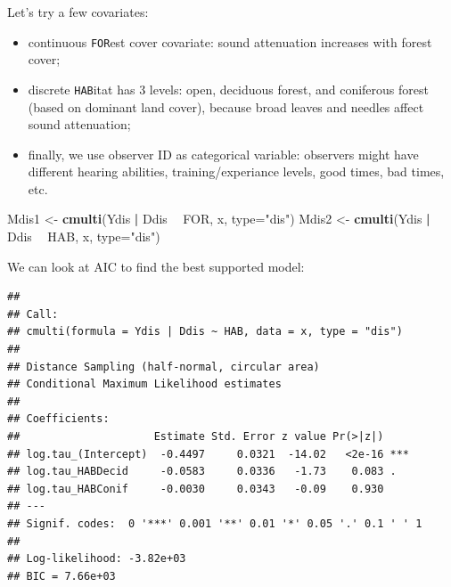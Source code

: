 \documentclass[12pt,]{book}
\newenvironment{Shaded}{\begin{snugshade}}{\end{snugshade}}
\newcommand{\DataTypeTok}[1]{\textcolor[rgb]{0.13,0.29,0.53}{#1}}
\newcommand{\DecValTok}[1]{\textcolor[rgb]{0.00,0.00,0.81}{#1}}
\newcommand{\KeywordTok}[1]{\textcolor[rgb]{0.13,0.29,0.53}{\textbf{#1}}}
\newcommand{\NormalTok}[1]{#1}
\newcommand{\OperatorTok}[1]{\textcolor[rgb]{0.81,0.36,0.00}{\textbf{#1}}}
\newcommand{\StringTok}[1]{\textcolor[rgb]{0.31,0.60,0.02}{#1}}
\providecommand{\tightlist}{%
  \setlength{\itemsep}{0pt}\setlength{\parskip}{0pt}}
\begin{document}
Let's try a few covariates:

\begin{itemize}
\tightlist
\item
  continuous \texttt{FOR}est cover covariate: sound attenuation increases with forest cover;
\item
  discrete \texttt{HAB}itat has 3 levels: open, deciduous forest, and coniferous forest (based on dominant land cover), because broad leaves and needles affect sound attenuation;
\item
  finally, we use observer ID as categorical variable: observers might have different hearing abilities, training/experiance levels, good times, bad times, etc.
\end{itemize}

\begin{Shaded}
\begin{Highlighting}[]
\NormalTok{Mdis1 <-}\StringTok{ }\KeywordTok{cmulti}\NormalTok{(Ydis }\OperatorTok{|}\StringTok{ }\NormalTok{Ddis }\OperatorTok{~}\StringTok{ }\NormalTok{FOR, x, }\DataTypeTok{type=}\StringTok{"dis"}\NormalTok{)}
\NormalTok{Mdis2 <-}\StringTok{ }\KeywordTok{cmulti}\NormalTok{(Ydis }\OperatorTok{|}\StringTok{ }\NormalTok{Ddis }\OperatorTok{~}\StringTok{ }\NormalTok{HAB, x, }\DataTypeTok{type=}\StringTok{"dis"}\NormalTok{)}
\end{Highlighting}
\end{Shaded}

We can look at AIC to find the best supported model:

\begin{Shaded}
\end{Shaded}

\begin{verbatim}
## 
## Call:
## cmulti(formula = Ydis | Ddis ~ HAB, data = x, type = "dis")
## 
## Distance Sampling (half-normal, circular area)
## Conditional Maximum Likelihood estimates
## 
## Coefficients:
##                     Estimate Std. Error z value Pr(>|z|)    
## log.tau_(Intercept)  -0.4497     0.0321  -14.02   <2e-16 ***
## log.tau_HABDecid     -0.0583     0.0336   -1.73    0.083 .  
## log.tau_HABConif     -0.0030     0.0343   -0.09    0.930    
## ---
## Signif. codes:  0 '***' 0.001 '**' 0.01 '*' 0.05 '.' 0.1 ' ' 1 
## 
## Log-likelihood: -3.82e+03 
## BIC = 7.66e+03
\end{verbatim}
\end{document}
